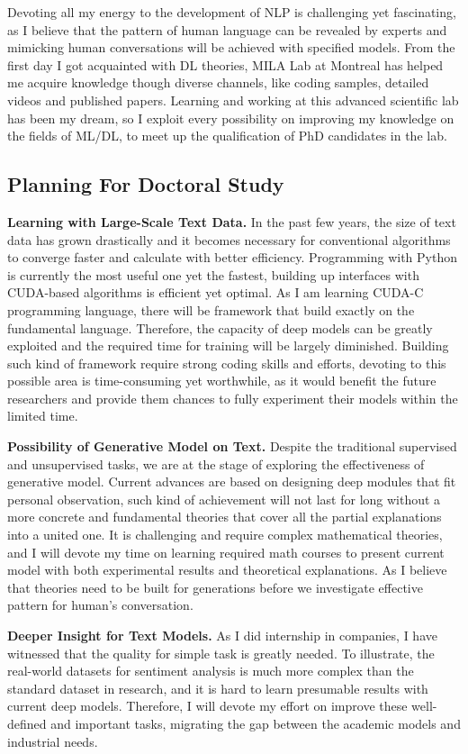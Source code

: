\documentclass[16pt，letterpaper]{ctexart}
\begin{document}
	Devoting all my energy to the development of NLP is challenging yet fascinating, as I believe that the pattern of human language can be revealed by experts and mimicking human conversations will be achieved with specified models. From the first day I got acquainted with DL theories, MILA Lab at Montreal has helped me acquire knowledge though diverse channels, like coding samples, detailed videos and published papers. Learning and working at this advanced scientific lab has been my dream, so I exploit every possibility on improving my knowledge on the fields of ML/DL, to meet up the qualification of PhD candidates in the lab.
	
	\subsection{Planning For Doctoral Study}
	
	\textbf{Learning with Large-Scale Text Data.}  In the past few years, the size of text data has grown drastically and it becomes necessary for conventional algorithms to converge faster and calculate with better efficiency. Programming with Python is currently the most useful one yet the fastest, building up interfaces with CUDA-based algorithms is efficient yet optimal. As I am learning CUDA-C programming language, there will be framework that build exactly on the fundamental language. Therefore, the capacity of deep models can be greatly exploited and the required time for training will be largely diminished. Building such kind of framework require strong coding skills and efforts, devoting to this possible area is time-consuming yet worthwhile, as it would benefit the future researchers and provide them chances to fully experiment their models within the limited time.
	
	\textbf{Possibility of Generative Model on Text.} Despite the traditional supervised and unsupervised tasks, we are at the stage of exploring the effectiveness of generative model. Current advances are based on designing deep modules that fit personal observation, such kind of achievement will not last for long without a more concrete and fundamental theories that cover all the partial explanations into a united one. It is challenging and require complex mathematical theories, and I will devote my time on learning required math courses to present current model with both experimental results and theoretical explanations. As I believe that theories need to be built for generations before we investigate effective pattern for human's conversation.
	
	\textbf{Deeper Insight for Text Models.} As I did internship in companies, I have witnessed that the quality for simple task is greatly needed. To illustrate, the real-world datasets for sentiment analysis is much more complex than the standard dataset in research, and it is hard to learn presumable results with current deep models. Therefore, I will devote my effort on improve these well-defined and important tasks, migrating the gap between the academic models and industrial needs.
\end{document}
